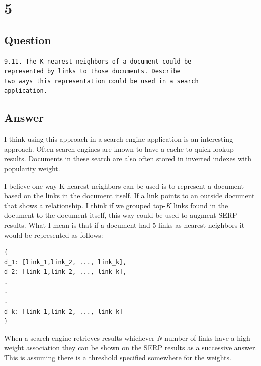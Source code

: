 \documentclass[letterpaper,11pt]{article}
\begin{document}
\clearpage


\section*{5}

\subsection*{Question}

\begin{verbatim}
9.11. The K nearest neighbors of a document could be 
represented by links to those documents. Describe 
two ways this representation could be used in a search
application.
\end{verbatim}

\subsection*{Answer}

I think using this approach in a search engine application is an interesting approach.
Often search engines are known to have a cache to quick lookup results.
Documents in these search are also often stored in inverted indexes with popularity weight.

I believe one way K nearest neighbors can be used is to represent a document based on the links in the document itself.
If a link points to an outside document that shows a relationship.
I think if we grouped top-\textit{K} links found in the document to the document itself, this way could be used to augment SERP results.
What I mean is that if a document had 5 links as nearest neighbors it would be represented as follows:

\begin{verbatim}
{
d_1: [link_1,link_2, ..., link_k],
d_2: [link_1,link_2, ..., link_k],
.
.
.
d_k: [link_1,link_2, ..., link_k]
}
\end{verbatim}

When a search engine retrieves results whichever \textit{N} number of links have a high weight association they can be shown on the SERP results as a successive answer.
This is assuming there is a threshold specified somewhere for the weights.
\end{document}
